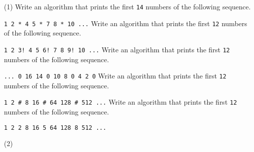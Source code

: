 \begin{exercise}
    \begin{longtasks}[resume=true](1)
        \task
        Write an algorithm that prints the first \texttt{14} numbers of the following sequence.

        \texttt{1 2 * 4 5 * 7 8 * 10 ...}
        \task
        Write an algorithm that prints the first \texttt{12} numbers of the following sequence.

        \texttt{1 2 3! 4 5 6! 7 8 9! 10 ...}
        \task
        Write an algorithm that prints the first \texttt{12} numbers of the following sequence.

        \texttt{... 0 16 14 0 10 8 0 4 2 0}
        \task
        Write an algorithm that prints the first \texttt{12} numbers of the following sequence.

        \texttt{1 2 \# 8 16 \# 64 128 \# 512 ...}
        \task
        Write an algorithm that prints the first \texttt{12} numbers of the following sequence.

        \texttt{1 2 2 8 16 5 64 128 8 512 ...}
    \end{longtasks}
\end{exercise}

\begin{solution}
    \begin{mltasks}(2)
        \task {}
        \task {}
        \task {}
        \task {}
        \task {}
    \end{mltasks}
\end{solution}
